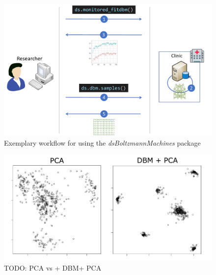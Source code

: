 \documentclass[12pt]{article}
\newcommand{\apkg}[1]{\emph{#1}}
\begin{document}
 


\begin{figure}[h]
   \centering
   \includegraphics[scale=0.5]{images/dsBoltzmannWorkflow.pdf}
   \caption{Exemplary workflow for using the \apkg{dsBoltzmannMachines} package}
 \end{figure}
 
 
 \begin{figure}[h]
   \centering
   \includegraphics[scale=1]{images/dbmvspca.pdf}
   \caption{TODO: PCA vs + DBM+ PCA}
 \end{figure}
 
\end{document}
